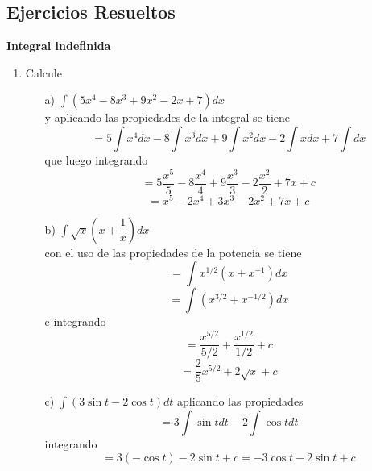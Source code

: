 \documentclass[10pt,twoside]{SelfArx} %
\begin{document}
 \subsection{Ejercicios Resueltos}
\textbf{Integral indefinida}\\
\begin{enumerate}
	


\item Calcule
\begin{enumerate}
	

\item[a)] $ \displaystyle \int(5x^{4}-8x^{3}+9x^{2}-2x+7)dx  $\\
y aplicando las propiedades de la integral se tiene
\begin{equation}
= 5\int x^{4}dx-8\int x^{3}dx+9\int x^{2}dx-2\int xdx+7\int dx
\end{equation}
que luego integrando
\begin{equation}
= 5\dfrac{x^{5}}{5}-8 \dfrac{x^{4}}{4}+9 \dfrac{x^{3}}{3}-2 \dfrac{x^{2}}{2}+7x+c
\end{equation}
\begin{equation}
= x^{5}-2x^{4}+3x^{3}-2 x^{2}+7x+c
\end{equation}
\item[b)] $\displaystyle \int \sqrt{x}\left (x+\dfrac{1}{x}\right )dx $\\
con el uso de las propiedades de la potencia se tiene
\begin{equation}
=\int x^{1/2}(x+x^{-1})dx
\end{equation}
\begin{equation}
=\int (x^{3/2}+x^{-1/2})dx
\end{equation}
e integrando
\begin{equation}
=\dfrac{x^{5/2}}{5/2}+\dfrac{x^{1/2}}{1/2}+c
\end{equation}
\begin{equation}
=\dfrac{2}{5}x^{5/2}+2\sqrt{x}+c
\end{equation}


\item[c)] $ \int (3\sin t-2\cos t)dt $
aplicando las propiedades
\begin{equation}
=3\int\sin tdt-2\int\cos tdt
\end{equation}
integrando
\begin{equation}
=3(-\cos t)-2\sin t+c=-3\cos t-2\sin t+c
\end{equation}
\end{enumerate}



\end{enumerate}
\end{document}
